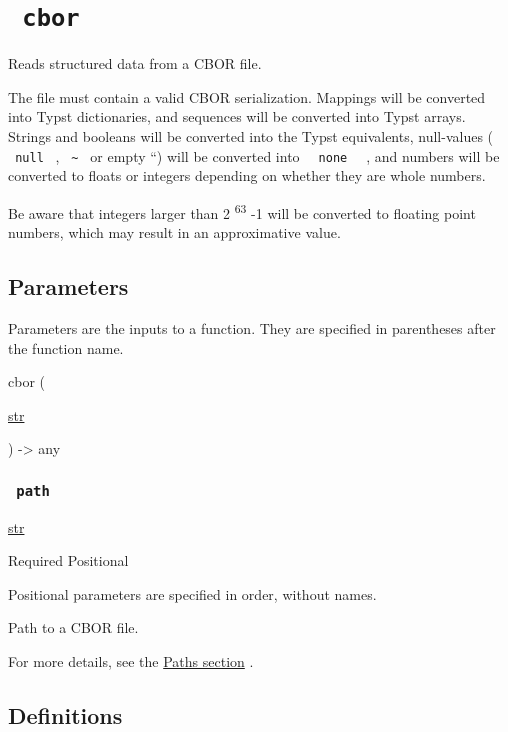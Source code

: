 \section{\texorpdfstring{\texttt{\ cbor\ }}{ cbor }}\label{summary}

Reads structured data from a CBOR file.

The file must contain a valid CBOR serialization. Mappings will be
converted into Typst dictionaries, and sequences will be converted into
Typst arrays. Strings and booleans will be converted into the Typst
equivalents, null-values ( \texttt{\ null\ } ,
\texttt{\ \textasciitilde{}\ } or empty ``) will be converted into
\texttt{\ }{\texttt{\ none\ }}\texttt{\ } , and numbers will be
converted to floats or integers depending on whether they are whole
numbers.

Be aware that integers larger than 2 \textsuperscript{63} -1 will be
converted to floating point numbers, which may result in an
approximative value.

\subsection{\texorpdfstring{{ Parameters
}}{ Parameters }}\label{parameters}

\label{parameters-tooltip}
Parameters are the inputs to a function. They are specified in
parentheses after the function name.

{ cbor } (

{ \href{/docs/reference/foundations/str/}{str} }

) -\textgreater{} { any }

\subsubsection{\texorpdfstring{\texttt{\ path\ }}{ path }}\label{parameters-path}

\href{/docs/reference/foundations/str/}{str}

{Required} {{ Positional }}

\label{parameters-path-positional-tooltip}
Positional parameters are specified in order, without names.

Path to a CBOR file.

For more details, see the \href{/docs/reference/syntax/\#paths}{Paths
section} .

\subsection{\texorpdfstring{{ Definitions
}}{ Definitions }}\label{definitions}

